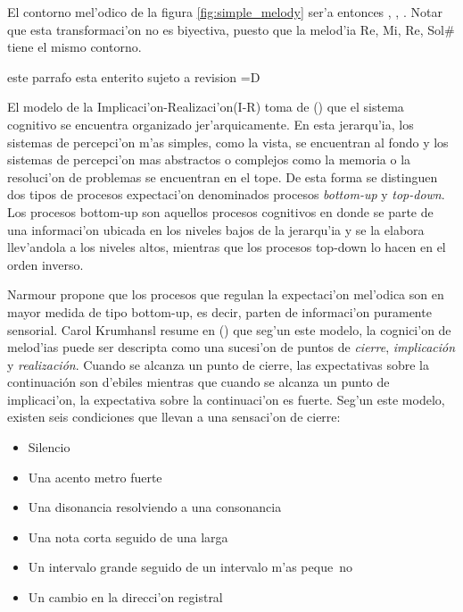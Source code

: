\begin{imagen}
    \width{11cm}
\end{imagen}

El contorno mel'odico de la figura \ref{fig:simple_melody} ser'a entonces , , .
Notar que esta transformaci'on no es biyectiva, puesto que la melod'ia Re, Mi, Re, Sol\# tiene el mismo contorno.

\alert{este parrafo esta enterito sujeto a revision =D}

El modelo de la Implicaci'on-Realizaci'on(I-R) toma de (\cita) que el sistema cognitivo se encuentra organizado jer'arquicamente. En esta jerarqu'ia, los sistemas 
de percepci'on m'as simples, como la vista, se encuentran al fondo y los sistemas de percepci'on mas abstractos o complejos como la memoria o la 
resoluci'on de problemas se encuentran en el tope. De esta forma se distinguen dos tipos de procesos expectaci'on denominados procesos \emph{bottom-up} 
y \emph{top-down}. Los procesos bottom-up son aquellos procesos cognitivos en donde se parte de una informaci'on ubicada en los niveles bajos de la jerarqu'ia y se la 
elabora llev'andola a los niveles altos, mientras que los procesos top-down lo hacen en el orden inverso. 

Narmour propone que los procesos que regulan la expectaci'on mel'odica son en mayor medida de tipo bottom-up, es decir, parten de informaci'on puramente sensorial. 
Carol Krumhansl resume en (\cita) que seg'un este modelo, la cognici'on de melod'ias puede ser descripta como una sucesi'on de puntos 
de \emph{cierre}, \emph{implicaci\'on} y \emph{realizaci\'on}. Cuando se alcanza un punto de cierre, las expectativas sobre la continuaci\'on 
son d'ebiles mientras que cuando se alcanza un punto de implicaci'on, la expectativa sobre la continuaci'on es fuerte. Seg'un este modelo,
existen seis condiciones que llevan a una sensaci'on de cierre:
\begin{itemize}
 \item Silencio
 \item Una acento metro fuerte
 \item Una disonancia resolviendo a una consonancia
 \item Una nota corta seguido de una larga
 \item Un intervalo grande seguido de un intervalo m'as peque~no
 \item Un cambio en la direcci'on registral
\end{itemize}

